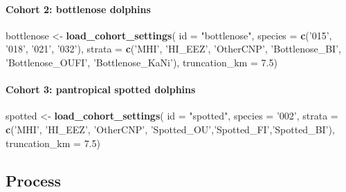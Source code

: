 \documentclass[
]{book}
\newenvironment{Shaded}{\begin{snugshade}}{\end{snugshade}}
\newcommand{\DataTypeTok}[1]{\textcolor[rgb]{0.13,0.29,0.53}{#1}}
\newcommand{\FloatTok}[1]{\textcolor[rgb]{0.00,0.00,0.81}{#1}}
\newcommand{\KeywordTok}[1]{\textcolor[rgb]{0.13,0.29,0.53}{\textbf{#1}}}
\newcommand{\NormalTok}[1]{#1}
\newcommand{\StringTok}[1]{\textcolor[rgb]{0.31,0.60,0.02}{#1}}
\begin{document}
\hypertarget{cohort-2-bottlenose-dolphins-1}{%
\paragraph{Cohort 2: bottlenose dolphins}\label{cohort-2-bottlenose-dolphins-1}}

\begin{Shaded}
\begin{Highlighting}[]
\NormalTok{bottlenose <-}\StringTok{ }\KeywordTok{load_cohort_settings}\NormalTok{(}
  \DataTypeTok{id =} \StringTok{"bottlenose"}\NormalTok{,}
  \DataTypeTok{species =} \KeywordTok{c}\NormalTok{(}\StringTok{'015'}\NormalTok{, }\StringTok{'018'}\NormalTok{, }\StringTok{'021'}\NormalTok{, }\StringTok{'032'}\NormalTok{),}
  \DataTypeTok{strata =} \KeywordTok{c}\NormalTok{(}\StringTok{'MHI'}\NormalTok{, }\StringTok{'HI_EEZ'}\NormalTok{, }\StringTok{'OtherCNP'}\NormalTok{,}
             \StringTok{'Bottlenose_BI'}\NormalTok{, }\StringTok{'Bottlenose_OUFI'}\NormalTok{, }\StringTok{'Bottlenose_KaNi'}\NormalTok{),}
  \DataTypeTok{truncation_km =} \FloatTok{7.5}\NormalTok{)}
\end{Highlighting}
\end{Shaded}

\hypertarget{cohort-3-pantropical-spotted-dolphins-1}{%
\paragraph{Cohort 3: pantropical spotted dolphins}\label{cohort-3-pantropical-spotted-dolphins-1}}

\begin{Shaded}
\begin{Highlighting}[]
\NormalTok{spotted <-}\StringTok{ }\KeywordTok{load_cohort_settings}\NormalTok{(}
  \DataTypeTok{id =} \StringTok{"spotted"}\NormalTok{,}
  \DataTypeTok{species =} \StringTok{'002'}\NormalTok{,}
  \DataTypeTok{strata =} \KeywordTok{c}\NormalTok{(}\StringTok{'MHI'}\NormalTok{, }\StringTok{'HI_EEZ'}\NormalTok{, }\StringTok{'OtherCNP'}\NormalTok{,}
             \StringTok{'Spotted_OU'}\NormalTok{,}\StringTok{'Spotted_FI'}\NormalTok{,}\StringTok{'Spotted_BI'}\NormalTok{),}
  \DataTypeTok{truncation_km =} \FloatTok{7.5}\NormalTok{)}
\end{Highlighting}
\end{Shaded}

\hypertarget{process-1}{%
\subsection*{Process}\label{process-1}}
\end{document}
